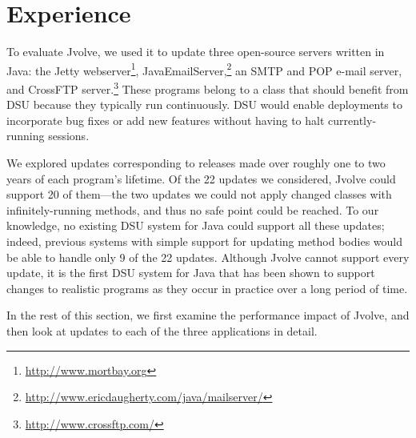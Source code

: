 \documentclass[9pt]{sigplanconf}
\newcommand{\DSU}{{\sc Jvolve}}
\begin{document}

\section{Experience}
\label{sec:experience}

To evaluate \DSU, we used it to update three open-source servers written
in Java: the Jetty webserver\footnote{\url{http://www.mortbay.org}},
JavaEmailServer,\footnote{\url{http://www.ericdaugherty.com/java/mailserver/}}
an SMTP and POP e-mail server, and CrossFTP server.\footnote{\url{http://www.crossftp.com/}}
These programs belong to a class that
should benefit from DSU because they typically run continuously. DSU
would enable deployments to incorporate bug fixes or add new features
without having to halt currently-running sessions.  

We explored
updates corresponding to releases made over roughly one to two years
of each program's lifetime.  Of the 22 updates we considered, \DSU{} could
support 20 of them---the two updates we could not apply changed
classes with infinitely-running methods, and thus no safe point could
be reached.  To our knowledge, no existing DSU system
for Java could support all these updates; indeed, previous systems
with simple support for updating method bodies would be able to handle only 9 of the 22 updates.  Although \DSU{} cannot support every
update, it is the first DSU system for Java
that has been shown to support changes to realistic programs as they
occur in practice over a long period of time.

In the rest of this section, we first examine the performance impact of
\DSU{}, and then look at updates to each of the three applications in
detail.
\end{document}
